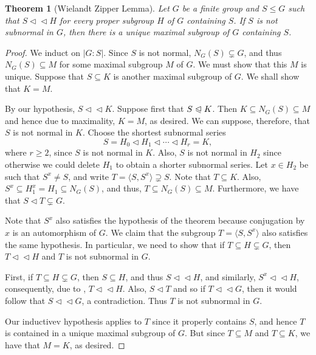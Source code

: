 \documentclass[12pt]{article}
\theoremstyle{thmstyle}
\newtheorem{theorem}{Theorem}[section]
\theoremstyle{defstyle}
\renewcommand{\le}{\leqslant}
\renewcommand{\ge}{\geqslant}
\newcommand{\nor}{\vartriangleleft}
\newcommand{\noreq}{\trianglelefteqslant}
\newcommand{\subnor}{\nor\!\nor}
\begin{document}
\begin{theorem}[Wielandt Zipper Lemma]
    Let $G$ be a finite group and $S\le G$ such that $S\subnor H$ for every proper subgroup $H$ of $G$ containing $S$. If $S$ is not subnormal in $G$, then there is a unique maximal subgroup of $G$ containing $S$.
\end{theorem}
\begin{proof}
    We induct on $|G : S|$. Since $S$ is not normal, $N_G(S)\subsetneq G$, and thus $N_G(S)\subseteq M$ for some maximal subgroup $M$ of $G$. We must show that this $M$ is unique. Suppose that $S\subseteq K$ is another maximal subgroup of $G$. We shall show that $K = M$.

    By our hypothesis, $S\subnor K$. Suppose first that $S\noreq K$. Then $K\subseteq N_G(S)\subseteq M$ and hence due to maximality, $K = M$, as desired. We can suppose, therefore, that $S$ is not normal in $K$. Choose the shortest subnormal series 
    \begin{equation*}
        S = H_0\nor H_1\nor\cdots\nor H_r = K,
    \end{equation*}
    where $r\ge 2$, since $S$ is not normal in $K$. Also, $S$ is not normal in $H_2$ since otherwise we could delete $H_1$ to obtain a shorter subnormal series. Let $x\in H_2$ be such that $S^x\ne S$, and write $T = \langle S, S^x\rangle\supsetneq S$. Note that $T\subseteq K$. Also, $S^x\subseteq H_1^x = H_1\subseteq N_G(S)$, and thus, $T\subseteq N_G(S)\subseteq M$. Furthermore, we have that $S\nor T\subsetneq G$.

    Note that $S^x$ also satisfies the hypothesis of the theorem because conjugation by $x$ is an automorphism of $G$. We claim that the subgroup $T = \langle S, S^x\rangle$ also satisfies the same hypothesis. In particular, we need to show that if $T\subseteq H\subsetneq G$, then $T\subnor H$ and $T$ is not subnormal in $G$.

    First, if $T\subseteq H\subsetneq G$, then $S\subseteq H$, and thus $S\subnor H$, and similarly, $S^x\subnor H$, consequently, due to , $T\subnor  H$. Also, $S\nor T$ and so if $T\subnor G$, then it would follow that $S\subnor G$, a contradiction. Thus $T$ is not subnormal in $G$.

    Our inductivev hypothesis applies to $T$ since it properly contains $S$, and hence $T$ is contained in a unique maximal subgroup of $G$. But since $T\subseteq M$ and $T\subseteq K$, we have that $M = K$, as desired.
\end{proof}
\end{document}
